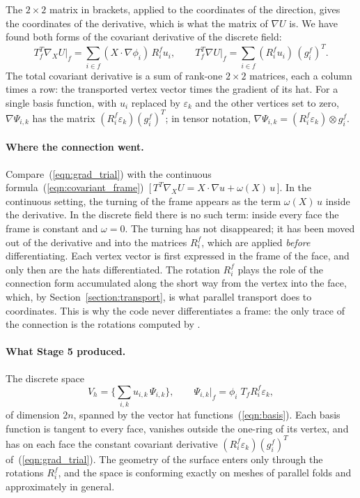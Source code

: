 The $2\times 2$ matrix in brackets, applied to the coordinates of the direction, gives the coordinates of the derivative, which is what the matrix of $\nabla U$ is. We have found both forms of the covariant derivative of the discrete field:
\begin{equation}
\label{eqn:grad_trial}
T_f^T \nabla_X U\big|_f = \sum_{i \in f} (X \cdot \nabla \phi_i)\, R_i^f u_i, \qquad T_f^T \nabla U\big|_f = \sum_{i \in f} (R_i^f u_i)\, (g_i^f)^T .
\end{equation}
The total covariant derivative is a sum of rank-one $2 \times 2$ matrices, each a column times a row: the transported vertex vector times the gradient of its hat. For a single basis function, with $u_i$ replaced by $\varepsilon_k$ and the other vertices set to zero, $\nabla \Psi_{i,k}$ has the matrix $(R_i^f \varepsilon_k)(g_i^f)^T$; in tensor notation, $\nabla \Psi_{i,k} = (R_i^f \varepsilon_k) \otimes g_i^f$.

\paragraph{Where the connection went.} Compare~(\ref{eqn:grad_trial}) with the continuous formula~(\ref{eqn:covariant_frame})~[\,$T^T\nabla_X U = X\cdot\nabla u + \omega(X)\,u$\,]. In the continuous setting, the turning of the frame appears as the term $\omega(X)\, u$ inside the derivative. In the discrete field there is no such term: inside every face the frame is constant and $\omega = 0$. The turning has not disappeared; it has been moved out of the derivative and into the matrices $R_i^f$, which are applied \emph{before} differentiating. Each vertex vector is first expressed in the frame of the face, and only then are the hats differentiated. The rotation $R_i^f$ plays the role of the connection form accumulated along the short way from the vertex into the face, which, by Section~\ref{section:transport}, is what parallel transport does to coordinates. This is why the code never differentiates a frame: the only trace of the connection is the rotations computed by .

\paragraph{What Stage 5 produced.} The discrete space
\begin{equation*}
V_h = \Big\{ \sum_{i,k} u_{i,k}\, \Psi_{i,k} \Big\}, \qquad \Psi_{i,k}\big|_f = \phi_i\; T_f R_i^f \varepsilon_k ,
\end{equation*}
of dimension $2n$, spanned by the vector hat functions~(\ref{eqn:basis}). Each basis function is tangent to every face, vanishes outside the one-ring of its vertex, and has on each face the constant covariant derivative $(R_i^f\varepsilon_k)(g_i^f)^T$ of~(\ref{eqn:grad_trial}). The geometry of the surface enters only through the rotations $R_i^f$, and the space is conforming exactly on meshes of parallel folds and approximately in general.

